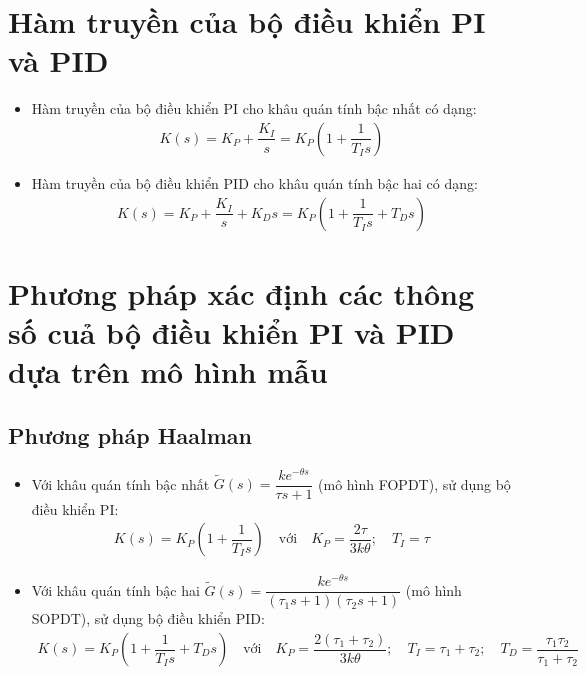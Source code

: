 \section{Hàm truyền của bộ điều khiển PI và PID}
    \begin{itemize}
        \item Hàm truyền của bộ điều khiển PI cho khâu quán tính bậc nhất có dạng:
            \begin{align*}
                K(s) = K_P + \dfrac{K_I}{s} = K_P \left({1 + \dfrac{1}{T_I s}}\right)
            \end{align*}

        \item Hàm truyền của bộ điều khiển PID cho khâu quán tính bậc hai có dạng:
            \begin{align*}
                K(s) = K_P + \dfrac{K_I}{s} + K_D s = K_P \left({1 + \dfrac{1}{T_I s} + T_D s}\right)
            \end{align*}
    \end{itemize}

\section{Phương pháp xác định các thông số cuả bộ điều khiển PI và PID dựa trên mô hình mẫu}
\subsection{Phương pháp Haalman}
    \begin{itemize}
        \item Với khâu quán tính bậc nhất $\tilde{G}(s) = \dfrac{k e^{-\theta s}}{\tau s + 1}$ (mô hình FOPDT), sử dụng bộ điều khiển PI:
            \begin{align*}
                K(s) = K_P \left({1 + \dfrac{1}{T_I s}}\right) \quad \textrm{với} \quad K_P = \dfrac{2 \tau}{3 k \theta}; \quad T_I = \tau
            \end{align*}

        \item Với khâu quán tính bậc hai $\tilde{G}(s) = \dfrac{k e^{-\theta s}}{\left({\tau_1 s + 1}\right) \left({\tau_2 s + 1}\right)}$ (mô hình SOPDT), sử dụng bộ điều khiển PID:
            \begin{align*}
                K(s) = K_P \left({1 + \dfrac{1}{T_I s} + T_D s}\right) \quad \textrm{với} \quad K_P = \dfrac{2 \left({\tau_1 + \tau_2}\right)}{3 k \theta}; \quad T_I = \tau_1 + \tau_2; \quad T_D = \dfrac{\tau_1 \tau_2}{\tau_1 + \tau_2}
            \end{align*}
    \end{itemize}

